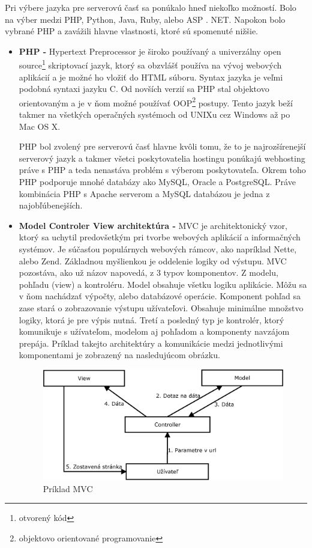 Pri výbere jazyka pre serverovú časť sa ponúkalo hneď niekoľko možností. Bolo na výber medzi PHP, Python, Java, Ruby, alebo ASP . NET. Napokon bolo vybrané PHP a zavážili hlavne vlastnosti, ktoré sú spomenuté nižšie.
\begin{itemize}  
\item \textbf{PHP -} Hypertext Preprocessor je široko používaný a univerzálny open source\footnote{otvorený kód} skriptovací jazyk, ktorý sa obzvlášť používa na vývoj webových aplikácií a je možné ho vložiť do HTML súboru. Syntax jazyka je veľmi podobná syntaxi jazyku C. Od novších verzií sa PHP stal objektovo orientovaným a je v ňom možné používať OOP\footnote{objektovo orientované programovanie} postupy. Tento jazyk beží takmer na všetkých operačných systémoch od UNIXu cez Windows až po Mac OS X. \cite{Gutmans2005}

PHP bol zvolený pre serverovú časť hlavne kvôli tomu, že to je najrozšírenejší serverový jazyk a takmer všetci poskytovatelia hostingu ponúkajú webhosting práve s PHP a teda nenastáva problém s výberom poskytovateľa. Okrem toho PHP podporuje mnohé databázy ako MySQL, Oracle a PostgreSQL. Práve kombinácia PHP s Apache serverom a MySQL databázou je jedna z najobľúbenejších.

\item \textbf{Model Controler View architektúra -} MVC je architektonický vzor, ktorý sa uchytil predovšetkým pri tvorbe webových aplikácií a informačných systémov. Je súčasťou populárnych webových rámcov, ako napríklad Nette, alebo Zend. Základnou myšlienkou je oddelenie logiky od výstupu. MVC pozostáva, ako už názov napovedá, z 3 typov komponentov. Z modelu, pohľadu (view) a kontroléru. Model obsahuje všetku logiku aplikácie. Môžu sa v ňom nachádzať výpočty, alebo databázové operácie. Komponent pohľad sa zase stará o zobrazovanie výstupu užívateľovi. Obsahuje minimálne množstvo logiky, ktorá je pre výpis nutná. Tretí a posledný typ je kontrolér, ktorý komunikuje s užívateľom, modelom aj pohľadom a komponenty navzájom prepája. Príklad takejto architektúry a komunikácie medzi jednotlivými komponentami je zobrazený na nasledujúcom obrázku. \cite{Capka2013}
\begin{figure}[h]
  \centering
  \includegraphics[scale=0.40]{fig/mvc.eps}
  \caption{Príklad MVC}
  \label{fig:mvc}
\end{figure}


\end{itemize}
